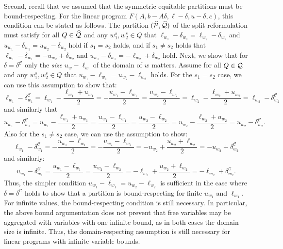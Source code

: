 \documentclass[pdflatex,sn-mathphys-num]{sn-jnl}%
\theoremstyle{thmstyleone}%
\theoremstyle{thmstylethree}%
\theoremstyle{thmstyletwo}%
\begin{document}
Second, recall that we assumed that the symmetric equitable partitions must be bound-respecting. For the linear program $F(A,b- A \delta,\ell- \delta,u- \delta,c)$, this condition can be stated as follows.
The partition $(\widehat{\mathcal{P}},\widehat{\mathcal{Q}})$ of the split reformulation must satisfy for all $Q\in \widehat{\mathcal{Q}}$ and any $w_1^s,w_2^s\in Q$ that $\ell_{w_1} - \delta_{w_1} = \ell_{w_2} - \delta_{w_2}$ and $u_{w_1} - \delta_{w_1} = u_{w_2}- \delta_{w_2}$ hold if $s_1 = s_2$ holds, and if $s_1 \neq s_2$ holds that $\ell_{w_1} - \delta_{w_1} = -u_{w_2} + \delta_{w_2}$ and $u_{w_1} - \delta_{w_1} = - \ell_{w_2} + \delta_{w_2}$ hold. 
Next, we show that for $\delta = \delta^\mathcal{C}$ only the \emph{size} $u_w - \ell_w$ of the domain of $w$ matters.  
Assume for all $Q\in \mathcal{Q}$ and any $w_1^s,w_2^s \in Q$ that $u_{w_1} - \ell_{w_1} = u_{w_2} - \ell_{w_2}$ holds. For the $s_1 = s_2$ case, we can use this assumption to show that: 
\begin{equation*}
    \ell_{w_1} - \delta^\mathcal{C}_{w_1} = \ell_{w_1} - \frac{\ell_{w_1} + u_{w_1}}{2} = 
    -\frac{u_{w_1} - \ell_{w_1}}{2} = \frac{u_{w_2} - \ell_{w_2}}{2} = \ell_{w_2} - \frac{\ell_{w_2} + u_{w_2}}{2} = \ell_{w_2} - \delta^\mathcal{C}_{w_2}
\end{equation*}
and similarly that
\begin{equation*}
    u_{w_1} - \delta^\mathcal{C}_{w_1} = u_{w_1} - \frac{\ell_{w_1} + u_{w_1}}{2} = 
    \frac{u_{w_1} - \ell_{w_1}}{2} = \frac{u_{w_2} - \ell_{w_2}}{2} = u_{w_2} - \frac{\ell_{w_2} + u_{w_2}}{2} = u_{w_2} - \delta^\mathcal{C}_{w_2}.
\end{equation*}
Also for the $s_1 \neq s_2$ case, we can use the assumption to show:
\begin{equation*}
\ell_{w_1} - \delta^\mathcal{C}_{w_1} =
-\frac{u_{w_1} - \ell_{w_1}}{2} = -\frac{u_{w_2} - \ell_{w_2}}{2} = - u_{w_2} + \frac{u_{w_2} + \ell_{w_2}}2 = -u_{w_2} + \delta^\mathcal{C}_{w_2}
\end{equation*}
and similarly:
\begin{equation*}
u_{w_1} - \delta^\mathcal{C}_{w_1} =
\frac{u_{w_1} - \ell_{w_1}}{2} = \frac{u_{w_2} - \ell_{w_2}}{2} = - \ell_{w_2} + \frac{u_{w_2} + \ell_{w_2}}2 = -\ell_{w_2} + \delta^\mathcal{C}_{w_2}.
\end{equation*}
Thus, the simpler condition $u_{w_1} - \ell_{w_1} = u_{w_2} - \ell_{w_2}$ is sufficient in the case where $\delta = \delta^{\mathcal{C}}$ holds to show that a partition is bound-respecting for finite $u_{w_1}$ and $\ell_{w_1}$. For infinite values, the bound-respecting condition is still necessary. In particular, the above bound argumentation does not prevent that free variables may be aggregated with variables with one infinite bound, as in both cases the domain size is infinite. Thus, the domain-respecting assumption is still necessary for linear programs with infinite variable bounds.\\
\end{document}

